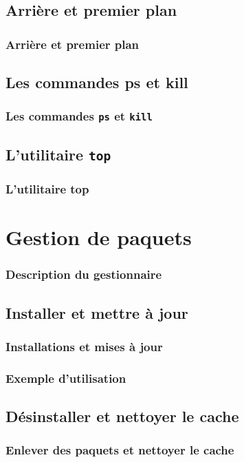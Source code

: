 \documentclass{beamer}
\begin{document}
    \subsection{Arrière et premier plan}
    \begin{frame}
        \frametitle{Arrière et premier plan}
    \end{frame}

    \subsection{Les commandes ps et kill}
    \begin{frame}
        \frametitle{Les commandes \texttt{ps} et \texttt{kill}}
    \end{frame}

    \subsection{L'utilitaire \texttt{top}}
    \begin{frame}
        \frametitle{L'utilitaire top}
    \end{frame}

    \section{Gestion de paquets}
    \begin{frame}
        \frametitle{Description du gestionnaire}
    \end{frame}

    \subsection{Installer et mettre à jour}
    \begin{frame}
        \frametitle{Installations et mises à jour}
    \end{frame}

    \begin{frame}
        \frametitle{Exemple d'utilisation}
    \end{frame}

    \subsection{Désinstaller et nettoyer le cache}
    \begin{frame}
        \frametitle{Enlever des paquets et nettoyer le cache}
    \end{frame}
\end{document}
